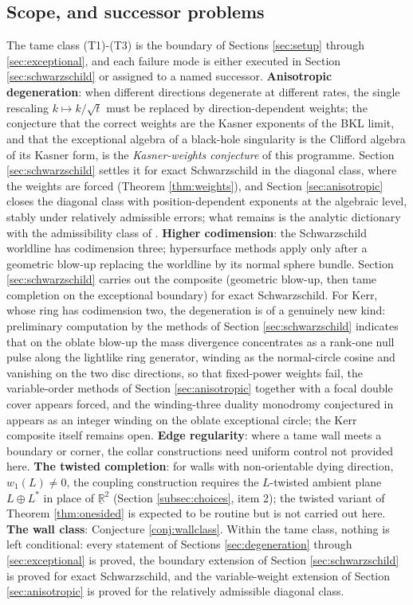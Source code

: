 \documentclass[11pt]{article}
\theoremstyle{definition}
\newcommand{\R}{\mathbb{R}}
\newcommand{\shL}{L}
\begin{document}
\subsection{Scope, and successor problems}\label{subsec:scope}

The tame class (T1)-(T3) is the boundary of Sections \ref{sec:setup} through \ref{sec:exceptional}, and each failure mode is either executed in Section \ref{sec:schwarzschild} or assigned to a named successor. \textbf{Anisotropic degeneration}: when different directions degenerate at different rates, the single rescaling $k \mapsto k/\sqrt t$ must be replaced by direction-dependent weights; the conjecture that the correct weights are the Kasner exponents of the BKL limit, and that the exceptional algebra of a black-hole singularity is the Clifford algebra of its Kasner form, is the \emph{Kasner-weights conjecture} of this programme. Section \ref{sec:schwarzschild} settles it for exact Schwarzschild in the diagonal class, where the weights are forced (Theorem \ref{thm:weights}), and Section \ref{sec:anisotropic} closes the diagonal class with position-dependent exponents at the algebraic level, stably under relatively admissible errors; what remains is the analytic dictionary with the admissibility class of \cite{ButlerT6}. \textbf{Higher codimension}: the Schwarzschild worldline has codimension three; hypersurface methods apply only after a geometric blow-up replacing the worldline by its normal sphere bundle. Section \ref{sec:schwarzschild} carries out the composite (geometric blow-up, then tame completion on the exceptional boundary) for exact Schwarzschild. For Kerr, whose ring has codimension two, the degeneration is of a genuinely new kind: preliminary computation by the methods of Section \ref{sec:schwarzschild} indicates that on the oblate blow-up the mass divergence concentrates as a rank-one null pulse along the lightlike ring generator, winding as the normal-circle cosine and vanishing on the two disc directions, so that fixed-power weights fail, the variable-order methods of Section \ref{sec:anisotropic} together with a focal double cover appears forced, and the winding-three duality monodromy conjectured in \cite{ButlerT6} appears as an integer winding on the oblate exceptional circle; the Kerr composite itself remains open. \textbf{Edge regularity}: where a tame wall meets a boundary or corner, the collar constructions need uniform control not provided here. \textbf{The twisted completion}: for walls with non-orientable dying direction, $w_1(\shL) \neq 0$, the coupling construction requires the $\shL$-twisted ambient plane $\shL \oplus \shL^*$ in place of $\underline{\R}^2$ (Section \ref{subsec:choices}, item 2); the twisted variant of Theorem \ref{thm:onesided} is expected to be routine but is not carried out here. \textbf{The wall class}: Conjecture \ref{conj:wallclass}. Within the tame class, nothing is left conditional: every statement of Sections \ref{sec:degeneration} through \ref{sec:exceptional} is proved, the boundary extension of Section \ref{sec:schwarzschild} is proved for exact Schwarzschild, and the variable-weight extension of Section \ref{sec:anisotropic} is proved for the relatively admissible diagonal class.
\end{document}
